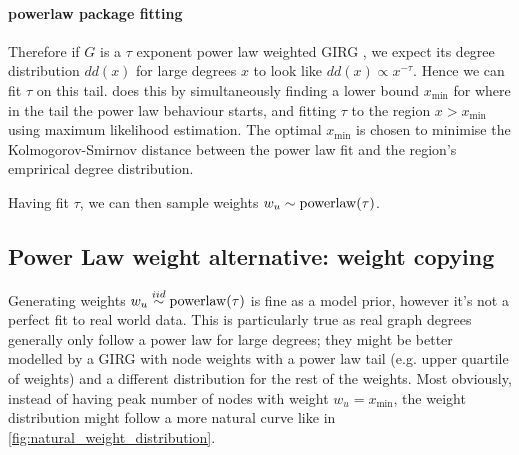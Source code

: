 \paragraph{powerlaw package fitting}
Therefore if $G$ is a $\tau$ exponent power law weighted GIRG , we expect its degree distribution $dd(x)$ for large degrees $x$ to look like $dd(x) \propto x^{-\tau}$. Hence we can fit $\tau$ on this tail. \PLP does this by simultaneously finding a lower bound $x_{\min}$ for where in the tail the power law behaviour starts, and fitting $\tau$ to the region $x > x_{\min}$ using maximum likelihood estimation. The optimal $x_{\min}$ is chosen to minimise the Kolmogorov-Smirnov distance between the power law fit and the region's emprirical degree distribution.

Having fit $\tau$, we can then sample weights $w_u \sim \operatorname{powerlaw}(\tau)$.


\subsection{Power Law weight alternative: weight copying}
Generating weights $w_u \stackrel{iid}{\sim} \operatorname{powerlaw}(\tau)$ is fine as a model prior, however it's not a perfect fit to real world data. This is particularly true as real graph degrees generally only follow a power law for large degrees; they might be better modelled by a GIRG with node weights with a power law tail (e.g. upper quartile of weights) and a different distribution for the rest of the weights. Most obviously, instead of having peak number of nodes with weight $w_u = x_{\min}$, the weight distribution might follow a more natural curve like in \cref{fig:natural_weight_distribution}.


